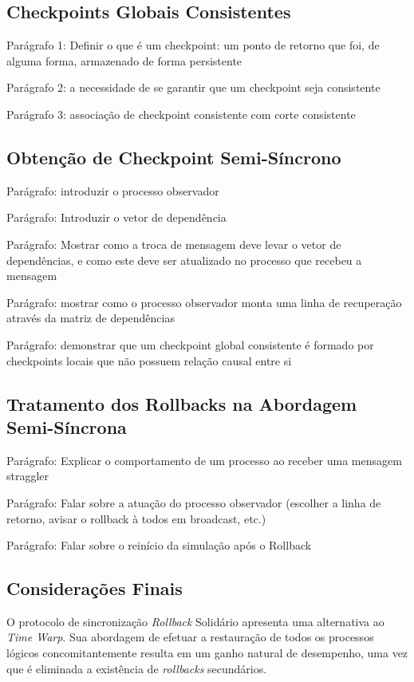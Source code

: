 \subsection{Checkpoints Globais Consistentes}

Parágrafo 1: Definir o que é um checkpoint: um ponto de retorno que foi, de alguma forma, armazenado de forma persistente

Parágrafo 2: a necessidade de se garantir que um checkpoint seja consistente

Parágrafo 3: associação de checkpoint consistente com corte consistente

\subsection{Obtenção de Checkpoint Semi-Síncrono}

Parágrafo: introduzir o processo observador

Parágrafo: Introduzir o vetor de dependência

Parágrafo: Mostrar como a troca de mensagem deve levar o vetor de dependências, e como este deve ser atualizado no processo que recebeu a mensagem

Parágrafo: mostrar como o processo observador monta uma linha de recuperação através da matriz de dependências

Parágrafo: demonstrar que um checkpoint global consistente é formado por checkpoints locais que não possuem relação causal entre si


\subsection{Tratamento dos Rollbacks na Abordagem Semi-Síncrona}

Parágrafo: Explicar o comportamento de um processo ao receber uma mensagem straggler 

Parágrafo: Falar sobre a atuação do processo observador (escolher a linha de retorno, avisar o rollback à todos em broadcast, etc.)

Parágrafo: Falar sobre o reinício da simulação após o Rollback

\subsection{Considerações Finais}

O protocolo de sincronização \textit{Rollback} Solidário apresenta uma alternativa ao \textit{Time Warp}. Sua abordagem de efetuar a restauração de todos os processos lógicos concomitantemente resulta em um ganho natural de desempenho, uma vez que é eliminada a existência de \textit{rollbacks} secundários.


